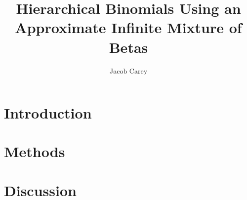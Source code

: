 \documentclass{article}
\begin{document}
\title{Hierarchical Binomials Using an Approximate Infinite Mixture of Betas}
\author{Jacob Carey}

\maketitle

\section{Introduction}

\section{Methods}

\section{Discussion}
\end{document}
